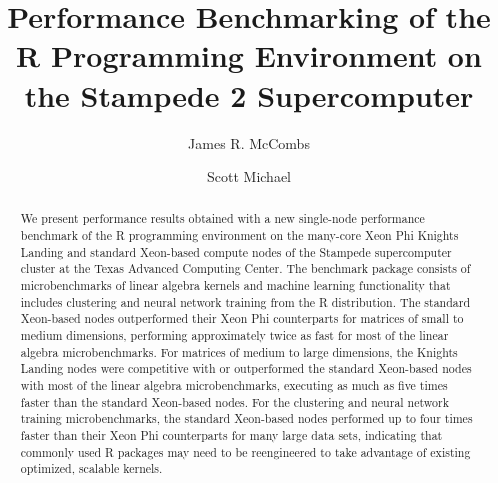 \documentclass[sigconf]{acmart}
\begin{document}
\title{Performance Benchmarking of the R Programming Environment on the Stampede 2 Supercomputer}


\author{James R. McCombs}

\author{Scott Michael}

\renewcommand{\shortauthors}{J.R. McCombs et al.}


\begin{abstract}

We present performance results obtained with a new single-node
performance benchmark of the R programming environment on
the many-core Xeon Phi Knights Landing and standard Xeon-based
compute nodes of the Stampede supercomputer cluster at the Texas
Advanced Computing Center.  The benchmark package consists of
microbenchmarks of linear algebra kernels and machine learning
functionality that includes clustering and neural network training
from the R distribution.  The standard Xeon-based nodes outperformed
their Xeon Phi counterparts for matrices of small to medium
dimensions, performing approximately twice as fast for most of the
linear algebra microbenchmarks.  For matrices of medium to large
dimensions, the Knights Landing nodes were
competitive with or outperformed the standard Xeon-based nodes with
most of the linear algebra microbenchmarks, executing as much as five
times faster than the standard Xeon-based nodes.  For the clustering and neural
network training microbenchmarks, the standard Xeon-based nodes
performed up to four times faster than their Xeon Phi counterparts
for many large data sets, indicating that commonly used R packages
may need to be reengineered to take advantage of existing optimized,
scalable kernels.

\end{abstract}
\end{document}
